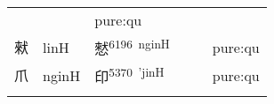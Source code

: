 \documentclass[14pt,a4paper]{scrartcl}
\begin{document}
\begin{longtable}[c]{@{}llllll@{}}
\begin{minipage}[t]{0.14\columnwidth}\raggedright\strut
\strut\end{minipage} &
\begin{minipage}[t]{0.14\columnwidth}\raggedright\strut
\strut\end{minipage} &
\begin{minipage}[t]{0.14\columnwidth}\raggedright\strut
pure:qu
\strut\end{minipage}\tabularnewline
\begin{minipage}[t]{0.14\columnwidth}\raggedright\strut
猌
\strut\end{minipage} &
\begin{minipage}[t]{0.14\columnwidth}\raggedright\strut
linH
\strut\end{minipage} &
\begin{minipage}[t]{0.14\columnwidth}\raggedright\strut
憖\textsuperscript{6196~nginH}
\strut\end{minipage} &
\begin{minipage}[t]{0.14\columnwidth}\raggedright\strut
\strut\end{minipage} &
\begin{minipage}[t]{0.14\columnwidth}\raggedright\strut
\strut\end{minipage} &
\begin{minipage}[t]{0.14\columnwidth}\raggedright\strut
pure:qu
\strut\end{minipage}\tabularnewline
\begin{minipage}[t]{0.14\columnwidth}\raggedright\strut
爪
\strut\end{minipage} &
\begin{minipage}[t]{0.14\columnwidth}\raggedright\strut
nginH
\strut\end{minipage} &
\begin{minipage}[t]{0.14\columnwidth}\raggedright\strut
印\textsuperscript{5370~'jinH}
\strut\end{minipage} &
\begin{minipage}[t]{0.14\columnwidth}\raggedright\strut
\strut\end{minipage} &
\begin{minipage}[t]{0.14\columnwidth}\raggedright\strut
\strut\end{minipage} &
\begin{minipage}[t]{0.14\columnwidth}\raggedright\strut
pure:qu
\strut\end{minipage}\tabularnewline
\begin{minipage}[t]{0.14\columnwidth}\raggedright\strut

\end{minipage}
\end{longtable}
\end{document}
